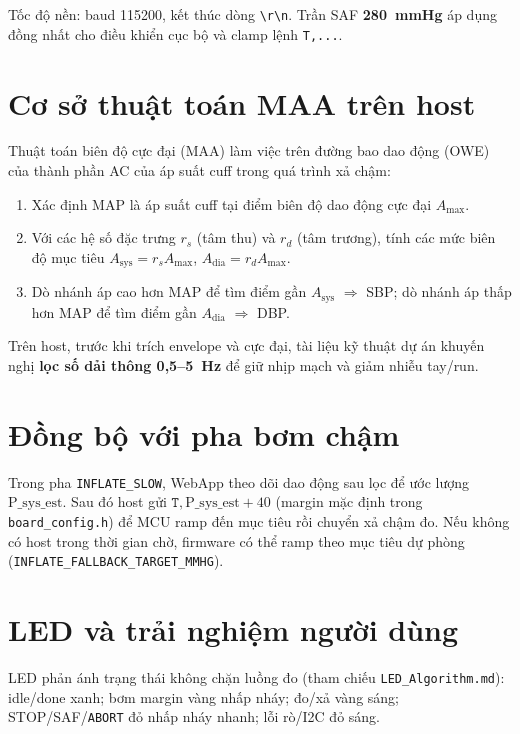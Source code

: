 Tốc độ nền: baud 115200, kết thúc dòng \texttt{\textbackslash r\textbackslash n}. Trần SAF \textbf{280~mmHg} áp dụng đồng nhất cho điều khiển cục bộ và clamp lệnh \texttt{T,...}.

\section{Cơ sở thuật toán MAA trên host}
Thuật toán biên độ cực đại (MAA) làm việc trên đường bao dao động (OWE) của thành phần AC của áp suất cuff trong quá trình xả chậm:
\begin{enumerate}\itemsep0pt
	\item Xác định \(\mathrm{MAP}\) là áp suất cuff tại điểm biên độ dao động cực đại \(A_{\max}\).
	\item Với các hệ số đặc trưng \(r_s\) (tâm thu) và \(r_d\) (tâm trương), tính các mức biên độ mục tiêu \(A_{\mathrm{sys}} = r_s A_{\max}\), \(A_{\mathrm{dia}} = r_d A_{\max}\).
	\item Dò nhánh áp cao hơn MAP để tìm điểm gần \(A_{\mathrm{sys}}\) \(\Rightarrow\) SBP; dò nhánh áp thấp hơn MAP để tìm điểm gần \(A_{\mathrm{dia}}\) \(\Rightarrow\) DBP.
\end{enumerate}

Trên host, trước khi trích envelope và cực đại, tài liệu kỹ thuật dự án khuyến nghị \textbf{lọc số dải thông 0{,}5--5~Hz} để giữ nhịp mạch và giảm nhiễu tay/run.

\section{Đồng bộ với pha bơm chậm}
Trong pha \texttt{INFLATE\_SLOW}, WebApp theo dõi dao động sau lọc để ước lượng \(\mathrm{P\_sys\_est}\). Sau đó host gửi \(\texttt{T},\mathrm{P\_sys\_est}+40\) (margin mặc định trong \texttt{board\_config.h}) để MCU ramp đến mục tiêu rồi chuyển xả chậm đo. Nếu không có host trong thời gian chờ, firmware có thể ramp theo mục tiêu dự phòng (\texttt{INFLATE\_FALLBACK\_TARGET\_MMHG}).

\section{LED và trải nghiệm người dùng}
LED phản ánh trạng thái không chặn luồng đo (tham chiếu \texttt{LED\_Algorithm.md}): idle/done xanh; bơm margin vàng nhấp nháy; đo/xả vàng sáng; STOP/SAF/\texttt{ABORT} đỏ nhấp nháy nhanh; lỗi rò/I2C đỏ sáng.
